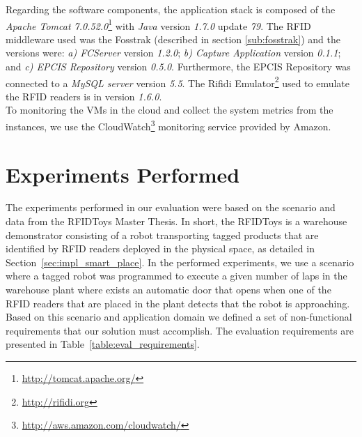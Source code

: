 Regarding the software components, the application stack is composed of the \textit{Apache Tomcat 7.0.52.0}\footnote{\url{http://tomcat.apache.org/}}
with \textit{Java} version \textit{1.7.0} update \textit{79}. The \gls{RFID} middleware used was the Fosstrak
(described in section \ref{sub:fosstrak}) and the versions were: \textit{a) \gls{FCServer}} version
\textit{1.2.0}; \textit{b) Capture Application} version \textit{0.1.1}; and \textit{c) \gls{EPCIS} Repository}
version \textit{0.5.0}. Furthermore, the \gls{EPCIS} Repository was connected to a \textit{MySQL server}
version \textit{5.5}. The Rifidi Emulator\footnote{\url{http://rifidi.org}} used to emulate the \gls{RFID}
readers is in version \textit{1.6.0}.\\

To monitoring the \glspl{VM} in the cloud and collect the system metrics from the instances, we use the
CloudWatch\footnote{\url{http://aws.amazon.com/cloudwatch/}} monitoring service provided by Amazon.

\section{Experiments Performed}
\label{sec:eval_experiments}
The experiments performed in our evaluation were based on the scenario and data from the RFIDToys \cite{Correia:Thesis:2014}
Master Thesis. In short, the RFIDToys is a warehouse demonstrator consisting of a robot transporting
tagged products that are identified by RFID readers deployed in the physical space, as detailed in
Section~\ref{sec:impl_smart_place}. In the performed experiments, we use a scenario where a tagged
robot was programmed to execute  a given number of laps in the warehouse plant where exists an automatic
door that opens when one of the RFID readers that are placed in the plant detects that the robot is
approaching.\\

Based on this scenario and application domain we defined a set of non-functional requirements that
our solution must accomplish. The evaluation requirements are presented in Table~\ref{table:eval_requirements}.

